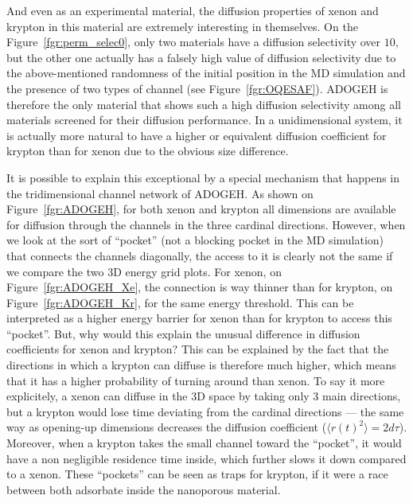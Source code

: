 \documentclass[main]{subfiles}
\begin{document}
And even as an experimental material, the diffusion properties of xenon and krypton in this material are extremely interesting in themselves. On the Figure~\ref{fgr:perm_selec0}, only two materials have a diffusion selectivity over $10$, but the other one actually has a falsely high value of diffusion selectivity due to the above-mentioned randomness of the initial position in the MD simulation and the presence of two types of channel (see Figure~\ref{fgr:OQESAF}). ADOGEH is therefore the only material that shows such a high diffusion selectivity among all materials screened for their diffusion performance. In a unidimensional system, it is actually more natural to have a higher or equivalent diffusion coefficient for krypton than for xenon due to the obvious size difference. 

It is possible to explain this exceptional by a special mechanism that happens in the tridimensional channel network of ADOGEH. As shown on Figure~\ref{fgr:ADOGEH}, for both xenon and krypton all dimensions are available for diffusion through the channels in the three cardinal directions. However, when we look at the sort of ``pocket'' (not a blocking pocket in the MD simulation) that connects the channels diagonally, the access to it is clearly not the same if we compare the two 3D energy grid plots. For xenon, on Figure~\ref{fgr:ADOGEH_Xe}, the connection is way thinner than for krypton, on Figure~\ref{fgr:ADOGEH_Kr}, for the same energy threshold. This can be interpreted as a higher energy barrier for xenon than for krypton to access this ``pocket''. But, why would this explain the unusual difference in diffusion coefficients for xenon and krypton? This can be explained by the fact that the directions in which a krypton can diffuse is therefore much higher, which means that it has a higher probability of turning around than xenon. To say it more explicitely, a xenon can diffuse in the 3D space by taking only 3 main directions, but a krypton would lose time deviating from the cardinal directions --- the same way as opening-up dimensions decreases the diffusion coefficient ($\langle{r(t)}^2\rangle=2d\tau$). Moreover, when a krypton takes the small channel toward the ``pocket'', it would have a non negligible residence time inside, which further slows it down compared to a xenon. These ``pockets'' can be seen as traps for krypton, if it were a race between both adsorbate inside the nanoporous material. 
\end{document}
